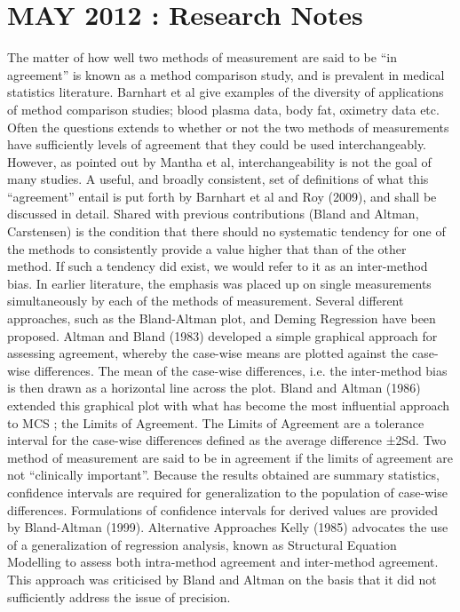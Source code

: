 \newpage

\section*{MAY 2012 : Research Notes}
The matter of how well two methods of measurement are said to be “in agreement” is known as a method comparison study, and is prevalent in medical statistics literature.  Barnhart et al give examples of the diversity of applications of method comparison studies; blood plasma data, body fat, oximetry data etc. 
Often the questions extends to whether or not the two methods of measurements have sufficiently levels of agreement that they could be used interchangeably. However, as pointed out by Mantha et al, interchangeability is not the goal of many studies.
A useful, and broadly consistent, set of definitions of what this “agreement” entail is put forth by Barnhart et al and Roy (2009), and shall be discussed in detail.
Shared with previous contributions (Bland and Altman, Carstensen) is the condition that there should no systematic tendency for one of the methods to consistently provide a value higher that than of the other method. If such a tendency did exist, we would refer to it as an inter-method bias.
In earlier literature, the emphasis was placed up on single measurements simultaneously by each of the methods of measurement. Several different approaches, such as the Bland-Altman plot, and Deming Regression have been proposed. 
Altman and Bland (1983) developed a simple graphical approach for assessing agreement,  whereby the case-wise means are plotted against the case-wise differences. The mean of the case-wise differences, i.e. the inter-method bias is then drawn as a horizontal line across the plot. 
Bland and Altman (1986) extended this graphical plot with what has become the most influential approach to MCS ; the Limits of Agreement. The Limits of Agreement are a tolerance interval for the case-wise differences defined as the average difference ±2Sd. Two method of measurement are said to be in agreement if the limits of agreement are not “clinically important”.
Because the results obtained are summary statistics, confidence intervals are required for generalization to the population of case-wise differences. Formulations of confidence intervals for derived values are provided by Bland-Altman (1999).
Alternative Approaches
Kelly (1985) advocates the use of a generalization of regression analysis, known as Structural Equation Modelling to assess both intra-method agreement and inter-method agreement. This approach was criticised by Bland and Altman on the basis that it did not sufficiently address the issue of precision.

